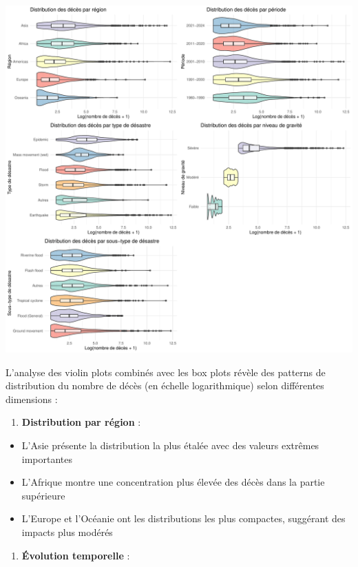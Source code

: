 \documentclass[
]{article}
\providecommand{\tightlist}{%
  \setlength{\itemsep}{0pt}\setlength{\parskip}{0pt}}
\begin{document}
\includegraphics{Projet_ML_files/figure-latex/distribution_by_categories-1.pdf}

L'analyse des violin plots combinés avec les box plots révèle des
patterns de distribution du nombre de décès (en échelle logarithmique)
selon différentes dimensions :

\begin{enumerate}
\def\labelenumi{\arabic{enumi}.}
\tightlist
\item
  \textbf{Distribution par région} :
\end{enumerate}

\begin{itemize}
\tightlist
\item
  L'Asie présente la distribution la plus étalée avec des valeurs
  extrêmes importantes
\item
  L'Afrique montre une concentration plus élevée des décès dans la
  partie supérieure
\item
  L'Europe et l'Océanie ont les distributions les plus compactes,
  suggérant des impacts plus modérés
\end{itemize}

\begin{enumerate}
\def\labelenumi{\arabic{enumi}.}
\setcounter{enumi}{1}
\tightlist
\item
  \textbf{Évolution temporelle} :
\end{enumerate}
\end{document}
